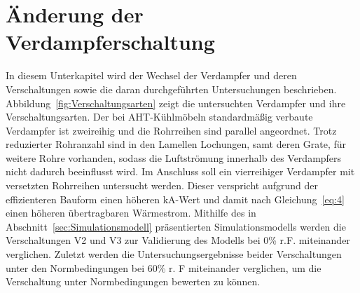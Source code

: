 \clearpage





\section{Änderung der Verdampferschaltung}
\label{sec:Änderung der Verdampferschaltung}

In diesem Unterkapitel wird der Wechsel der Verdampfer und deren Verschaltungen sowie die daran durchgeführten Untersuchungen beschrieben. Abbildung~\ref{fig:Verschaltungsarten} zeigt die untersuchten Verdampfer und ihre Verschaltungsarten. Der bei AHT-Kühlmöbeln standardmäßig verbaute Verdampfer ist zweireihig und die Rohrreihen sind parallel angeordnet. Trotz reduzierter Rohranzahl sind in den Lamellen Lochungen, samt deren Grate, für weitere Rohre vorhanden, sodass die Luftströmung innerhalb des Verdampfers nicht dadurch beeinflusst wird. Im Anschluss soll ein vierreihiger Verdampfer mit versetzten Rohrreihen untersucht werden. Dieser verspricht aufgrund der effizienteren Bauform einen höheren kA-Wert und damit nach Gleichung~\ref{eq:4} einen höheren übertragbaren Wärmestrom. Mithilfe des in Abschnitt~\ref{sec:Simulationsmodell} präsentierten Simulationsmodells werden die Verschaltungen V2 und V3 zur Validierung des Modells bei \unit{0}{\%} r.F.  miteinander verglichen. Zuletzt werden die Untersuchungsergebnisse beider Verschaltungen unter den Normbedingungen bei \unit{60}{\%} r. F miteinander verglichen, um die Verschaltung unter Normbedingungen bewerten zu können.

